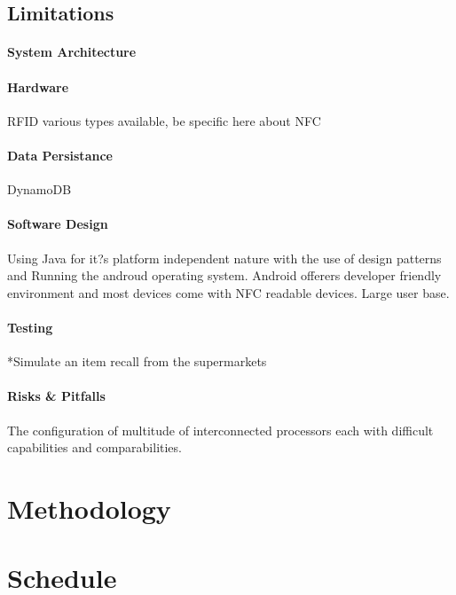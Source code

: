 \documentclass[a4paper, 11pt]{article}
\begin{document}
\subsection{Limitations}
\clearpage




\paragraph{System Architecture}

\paragraph{Hardware}
RFID various types available, be specific here about NFC

\paragraph{Data Persistance}
DynamoDB

\paragraph{Software Design}
Using Java for it?s platform independent nature with the use of design patterns and 
Running the androud operating system. Android offerers developer friendly environment and most devices come with NFC readable devices. Large user base.

\paragraph{Testing}
*Simulate an item recall from the supermarkets

\paragraph{Risks \& Pitfalls}
The configuration of multitude of interconnected processors each with difficult capabilities and comparabilities.

\clearpage

\section{Methodology}


\section{Schedule}
\end{document}
